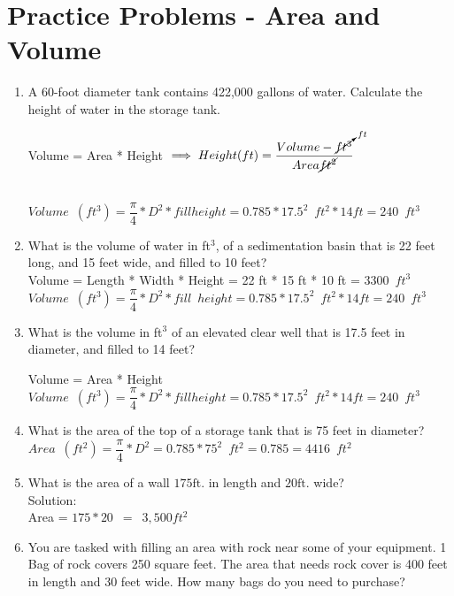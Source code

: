 \section*{Practice Problems - Area and Volume} 
\begin{enumerate}
\item A 60-foot diameter tank contains 422,000 gallons of water. Calculate the height of water in the storage tank.

Volume = Area * Height $\implies Height (ft) =\dfrac{Volume - \cancelto{ft}{ft^3}}{Area \cancel{ft^2}}$\\
\vspace{0.2cm}
\

$ Volume \enspace (ft^3) = \dfrac{\pi}{4}*D^2 * fill height = 0.785*17.5^2 \enspace ft^2 * 14 ft=\boxed{240\enspace ft^3}$


\item What is the volume of water in ft$^3$, of a sedimentation basin that is 22 feet long, and 15 feet wide, and filled to 10 feet?\\

Volume = Length * Width * Height = 22 ft * 15 ft * 10 ft = $\boxed{3300 \enspace ft^3}$\\
\vspace{0.2cm}
$ Volume \enspace (ft^3) = \dfrac{\pi}{4}*D^2 * fill \enspace height = 0.785*17.5^2 \enspace ft^2 * 14 ft=\boxed{240\enspace ft^3}$

\item What is the volume in ft$^3$ of an elevated clear well that is 17.5 feet in diameter, and filled to 14 feet?

Volume = Area * Height\\
\vspace{0.2cm}
$ Volume \enspace (ft^3) = \dfrac{\pi}{4}*D^2 * fill height = 0.785*17.5^2 \enspace ft^2 * 14 ft=\boxed{240\enspace ft^3}$

\item What is the area of the top of a storage tank that is 75 feet in diameter?\\

$Area \enspace (ft^2)= \dfrac{\pi}{4}*D^2= 0.785*75^2 \enspace ft^2=0.785 = \boxed{4416\enspace ft^2}$\\
\vspace{0.2cm}

\item  What is the area of a wall $175 \mathrm{ft}$. in length and $20 \mathrm{ft}$. wide?\\
\vspace{0.2cm}
Solution:\\
\vspace{0.2cm}
Area = $175 * 20 \enspace = \enspace \boxed{3,500 ft^2}$
\vspace{0.2cm}
\item  You are tasked with filling an area with rock near some of your equipment. 1 Bag of rock covers 250 square feet. The area that needs rock cover is 400 feet in length and 30 feet wide. How many bags do you need to purchase?\\


\end{enumerate}
